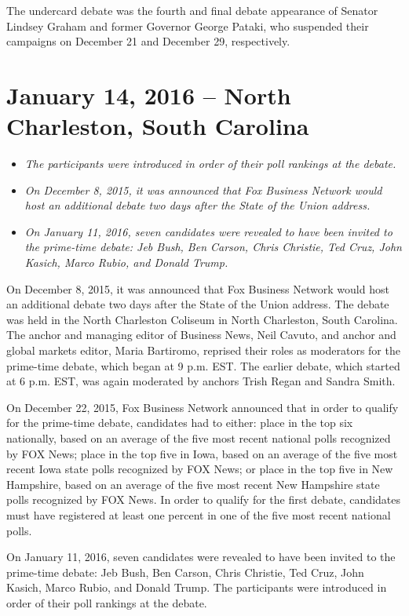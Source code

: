 The undercard debate was the fourth and final debate appearance of
Senator Lindsey Graham and former Governor George Pataki, who suspended
their campaigns on December 21 and December 29, respectively.

\section{January 14, 2016 -- North Charleston, South
Carolina}\label{january-14-2016-north-charleston-south-carolina}

\begin{itemize}
\item
  \emph{The participants were introduced in order of their poll rankings
  at the debate.}
\item
  \emph{On December 8, 2015, it was announced that Fox Business Network
  would host an additional debate two days after the State of the Union
  address.}
\item
  \emph{On January 11, 2016, seven candidates were revealed to have been
  invited to the prime-time debate: Jeb Bush, Ben Carson, Chris
  Christie, Ted Cruz, John Kasich, Marco Rubio, and Donald Trump.}
\end{itemize}

On December 8, 2015, it was announced that Fox Business Network would
host an additional debate two days after the State of the Union address.
The debate was held in the North Charleston Coliseum in North
Charleston, South Carolina. The anchor and managing editor of Business
News, Neil Cavuto, and anchor and global markets editor, Maria
Bartiromo, reprised their roles as moderators for the prime-time debate,
which began at 9 p.m. EST. The earlier debate, which started at 6 p.m.
EST, was again moderated by anchors Trish Regan and Sandra Smith.

On December 22, 2015, Fox Business Network announced that in order to
qualify for the prime-time debate, candidates had to either: place in
the top six nationally, based on an average of the five most recent
national polls recognized by FOX News; place in the top five in Iowa,
based on an average of the five most recent Iowa state polls recognized
by FOX News; or place in the top five in New Hampshire, based on an
average of the five most recent New Hampshire state polls recognized by
FOX News. In order to qualify for the first debate, candidates must have
registered at least one percent in one of the five most recent national
polls.

On January 11, 2016, seven candidates were revealed to have been invited
to the prime-time debate: Jeb Bush, Ben Carson, Chris Christie, Ted
Cruz, John Kasich, Marco Rubio, and Donald Trump. The participants were
introduced in order of their poll rankings at the debate.

